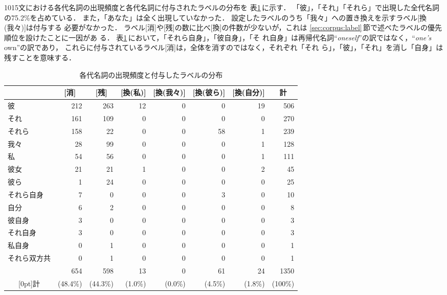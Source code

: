 1015文における各代名詞の出現頻度と各代名詞に付与されたラベルの分布を
表\ref{tab:pron-freq-label}\,に示す．
「彼」，「それ」「それら」で出現した全代名詞の75.2\%を占めている．
また，「あなた」は全く出現していなかった．
設定したラベルのうち「我々」への置き換えを示すラベル[換(我々)]は付与する
必要がなかった．
ラベル[消]や[残]の数に比べ[換]の件数が少ないが，これは
\ref{sec:corpus:label}\,節で述べたラベルの優先順位を設けたことに一因があ
る．
表\ref{tab:pron-freq-label}\,において，「それら自身」，「彼自身」，「そ
れ自身」は再帰代名詞``{\it oneself}''の訳ではなく，``{\it one's} own''の訳であり，
これらに付与されているラベル[消]は，全体を消すのではなく，それぞれ「それ
ら」，「彼」，「それ」を消し「自身」は残すことを意味する．
\begin{table}[htbp]
\caption{各代名詞の出現頻度と付与したラベルの分布}
\label{tab:pron-freq-label}
\begin{center}
\begin{tabular}{|l||r|r|r|r|r|r|r|}\hline
 & \multicolumn{1}{c|}{[消]} & \multicolumn{1}{|c}{[残]} &
\multicolumn{1}{|c}{[換(私)]} & \multicolumn{1}{|c}{[換(我々)]} &
\multicolumn{1}{|c}{[換(彼ら)]} & \multicolumn{1}{|c|}{[換(自分)]} & 
\multicolumn{1}{c|}{計} \\\hline\hline
彼		& 212 & 263 & 12 &  0 &  0 & 19 & 506 \\
それ		& 161 & 109 &  0 &  0 &  0 &  0 & 270 \\
それら		& 158 &  22 &  0 &  0 & 58 &  1 & 239 \\
我々		&  28 &  99 &  0 &  0 &  0 &  1 & 128 \\
私		&  54 &  56 &  0 &  0 &  0 &  1 & 111 \\
彼女		&  21 &  21 &  1 &  0 &  0 &  2 &  45 \\
彼ら		&   1 &  24 &  0 &  0 &  0 &  0 &  25 \\
それら自身	&   7 &   0 &  0 &  0 &  3 &  0 &  10 \\
自分		&   6 &   2 &  0 &  0 &  0 &  0 &   8 \\
彼自身		&   3 &   0 &  0 &  0 &  0 &  0 &   3 \\
それ自身	&   3 &   0 &  0 &  0 &  0 &  0 &   3 \\
私自身		&   0 &   1 &  0 &  0 &  0 &  0 &   1 \\
それら双方共	&   0 &   1 &  0 &  0 &  0 &  0 &   1 \\\hline
		& 654 & 598 & 13 &  0 & 61 & 24 & 1350 \\
\multicolumn{1}{|c||}{\raisebox{1.5ex}[0pt]{計}} &
(48.4\%) & (44.3\%) & (1.0\%) & (0.0\%) & (4.5\%) & (1.8\%) & (100\%)\\\hline
\end{tabular}
\end{center}
\end{table}

